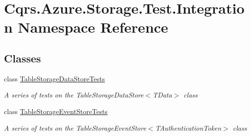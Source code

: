 \hypertarget{namespaceCqrs_1_1Azure_1_1Storage_1_1Test_1_1Integration}{}\section{Cqrs.\+Azure.\+Storage.\+Test.\+Integration Namespace Reference}
\label{namespaceCqrs_1_1Azure_1_1Storage_1_1Test_1_1Integration}
\subsection*{Classes}
\begin{DoxyCompactItemize}
\item 
class \hyperlink{classCqrs_1_1Azure_1_1Storage_1_1Test_1_1Integration_1_1TableStorageDataStoreTests}{Table\+Storage\+Data\+Store\+Tests}
\begin{DoxyCompactList}\small\item\em A series of tests on the Table\+Storage\+Data\+Store$<$\+T\+Data$>$ class \end{DoxyCompactList}\item 
class \hyperlink{classCqrs_1_1Azure_1_1Storage_1_1Test_1_1Integration_1_1TableStorageEventStoreTests}{Table\+Storage\+Event\+Store\+Tests}
\begin{DoxyCompactList}\small\item\em A series of tests on the Table\+Storage\+Event\+Store$<$\+T\+Authentication\+Token$>$ class \end{DoxyCompactList}\end{DoxyCompactItemize}
